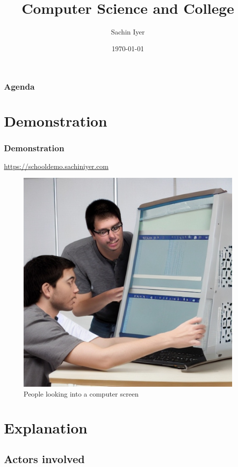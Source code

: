 \documentclass[
	11pt,
	t,
]{beamer}
\title[Computer Science and College]{Computer Science and College}
\author[Sachin Iyer]{Sachin Iyer}
\institute[NYU]{New York University \\ \smallskip \textit{sachiniyer@nyu.edu}}
\date[\today]{\today}
\begin{document}
\begin{frame}
	\titlepage
\end{frame}

\begin{frame}
	\frametitle{Agenda}
	\tableofcontents[pausesections]
\end{frame}

\section{Demonstration}

\begin{frame}
	\frametitle{Demonstration}
	\href{https://schooldemo.sachiniyer.com}{https://schooldemo.sachiniyer.com}
	\bigskip
	\begin{figure}
	  \includegraphics[scale=0.17]{1.jpg}
	  \caption{People looking into a computer screen}
	\end{figure}
\end{frame}


\section{Explanation}
\subsection{Actors involved}
\end{document}
